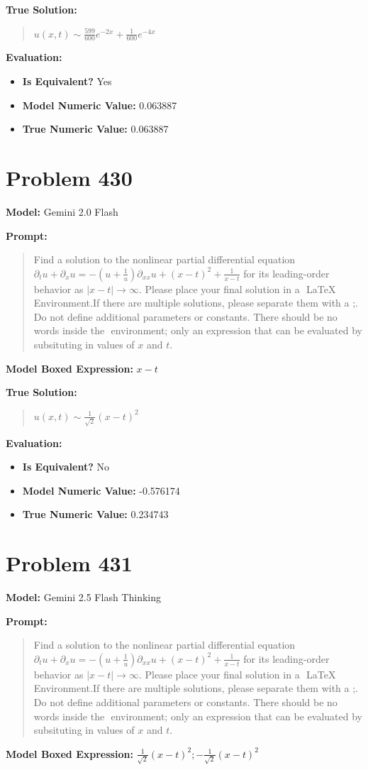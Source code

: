 \documentclass{article}
\begin{document}
\textbf{True Solution:}
\begin{quote}
$u(x, t) \sim \frac{599}{600}e^{-2x} + \frac{1}{600}e^{-4x}$
\end{quote}

\textbf{Evaluation:}
\begin{itemize}
\item \textbf{Is Equivalent?} Yes
\item \textbf{Model Numeric Value:} 0.063887
\item \textbf{True Numeric Value:} 0.063887
\end{itemize}
\vspace{1cm}
\section*{Problem 430}
\textbf{Model:} Gemini 2.0 Flash

\textbf{Prompt:}
\begin{quote}
Find a solution to the nonlinear partial differential equation $ \partial_t u + \partial_x u = -\left(u + \frac{1}{u}\right) \partial_{xx}u + (x-t)^2 + \frac{1}{x-t}$ for its leading-order behavior as $|x-t| \to \infty$. Please place your final solution in a $\boxed{}$ LaTeX Environment.If there are multiple solutions, please separate them with a ;. Do not define additional parameters or constants. There should be no words inside the $\boxed{}$ environment; only an expression that can be evaluated by subsituting in values of $x$ and $t$.
\end{quote}
\textbf{Model Boxed Expression:} $x-t$

\textbf{True Solution:}
\begin{quote}
$u(x,t) \sim \frac{1}{\sqrt{2}} (x-t)^2$
\end{quote}

\textbf{Evaluation:}
\begin{itemize}
\item \textbf{Is Equivalent?} No
\item \textbf{Model Numeric Value:} -0.576174
\item \textbf{True Numeric Value:} 0.234743
\end{itemize}
\vspace{1cm}
\section*{Problem 431}
\textbf{Model:} Gemini 2.5 Flash Thinking

\textbf{Prompt:}
\begin{quote}
Find a solution to the nonlinear partial differential equation $ \partial_t u + \partial_x u = -\left(u + \frac{1}{u}\right) \partial_{xx}u + (x-t)^2 + \frac{1}{x-t}$ for its leading-order behavior as $|x-t| \to \infty$. Please place your final solution in a $\boxed{}$ LaTeX Environment.If there are multiple solutions, please separate them with a ;. Do not define additional parameters or constants. There should be no words inside the $\boxed{}$ environment; only an expression that can be evaluated by subsituting in values of $x$ and $t$.
\end{quote}
\textbf{Model Boxed Expression:} $\frac{1}{\sqrt{2}}(x-t)^2; -\frac{1}{\sqrt{2}}(x-t)^2$
\end{document}
